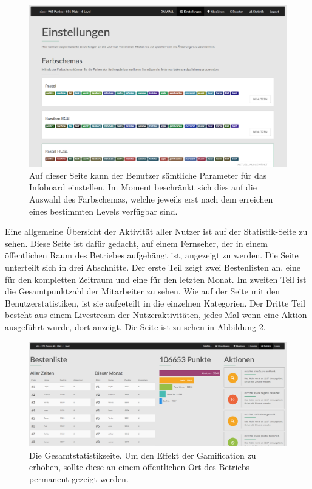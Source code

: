 \documentclass[12pt,twoside]{book}
\begin{document}
\begin{figure}[htbp]
    \centering
    \includegraphics[width=1.0\textwidth]{images/infoboard_settings.png}
    \caption{Auf dieser Seite kann der Benutzer sämtliche Parameter für das Infoboard einstellen. Im Moment beschränkt sich dies auf die Auswahl des Farbschemas, welche jeweils erst nach dem erreichen eines bestimmten Levels verfügbar sind.}
    \label{fig:settings}
\end{figure}

Eine allgemeine Übersicht der Aktivität aller Nutzer ist auf der Statistik-Seite zu sehen. Diese Seite ist dafür gedacht, auf einem Fernseher, der in einem öffentlichen Raum des Betriebes aufgehängt ist, angezeigt zu werden. Die Seite unterteilt sich in drei Abschnitte. Der erste Teil zeigt zwei Bestenlisten an, eine für den kompletten Zeitraum und eine für den letzten Monat. Im zweiten Teil ist die Gesamtpunktzahl der Mitarbeiter zu sehen. Wie auf der Seite mit den Benutzerstatistiken, ist sie aufgeteilt in die einzelnen Kategorien. Der Dritte Teil besteht aus einem Livestream der Nutzeraktivitäten, jedes Mal wenn eine Aktion ausgeführt wurde, dort anzeigt. Die Seite ist zu sehen in Abbildung \ref{fig:stats}.

\begin{figure}[htbp]
    \centering
    \includegraphics[width=1.0\textwidth]{images/infoboard_stats.png}
    \caption{Die Gesamtstatistikseite. Um den Effekt der Gamification zu erhöhen, sollte diese an einem öffentlichen Ort des Betriebs permanent gezeigt werden.}
    \label{fig:stats}
\end{figure}
\end{document}
